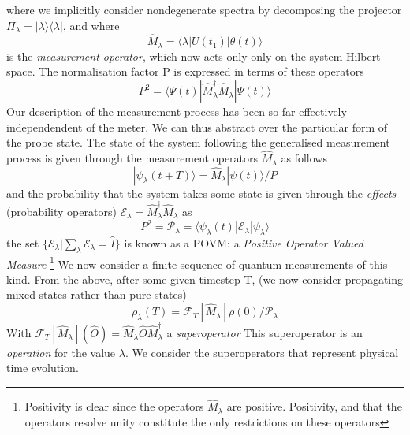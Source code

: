 where we implicitly consider nondegenerate spectra by decomposing the projector $\Pi_\lambda = |\lambda \rangle \langle \lambda |$, and where
\begin{equation}
     \hat{M}_\lambda = \langle \lambda | U(t_1) | \theta(t) \rangle
\end{equation}
is the \emph{measurement operator}, which now acts only only on the system Hilbert space.
The normalisation factor P is expressed in terms of these operators
\begin{equation}
     P^2 = \langle \Psi (t) | \hat{M}_\lambda^\dagger \hat{M}_\lambda | \Psi (t) \rangle
\end{equation}
 Our description of the measurement process has been so far effectively independendent of the meter.
We can thus abstract over the particular form of the probe state.
The state of the system following the generalised measurement process is given through the measurement operators $\hat{M}_\lambda$ as follows
\begin{equation}
 | \psi_\lambda (t + T) \rangle = \hat{M}_\lambda | \psi(t) \rangle /P
\end{equation}
 and the probability that the system takes some state is given through the \emph{effects} (probability operators) $ \mathscr{E}_\lambda = \hat{M}_\lambda^\dagger \hat{M}_\lambda $ as
\begin{equation}
     P^2 = \mathscr{P}_\lambda = \langle \psi_\lambda (t) | \mathscr{E}_\lambda | \psi_\lambda \rangle
\end{equation}
 the set $\{\mathscr{E}_\lambda | \sum_\lambda \mathscr{E}_\lambda = \hat{I} \} $ is known as a POVM: a \emph{Positive Operator Valued Measure} \footnote{Positivity is clear since the operators $\hat{M}_\lambda$ are positive.
Positivity, and that the operators resolve unity constitute the only restrictions on these operators}
We now consider a finite sequence of quantum measurements of this kind.
From the above, after some given timestep T, (we now consider propagating mixed states rather than pure states)
\begin{equation}
     \rho_\lambda (T) = \mathscr{F}_T[\hat{M}_\lambda] \rho(0) / \mathscr{P}_\lambda
\end{equation}
With $\mathscr{F}_T[\hat{M}_\lambda] ( \hat{O} ) =  \hat{M}_\lambda \hat{O} \hat{M}_\lambda ^ \dagger$ a \emph{superoperator}
This superoperator is an \emph{operation} for the value $\lambda$.
We consider the superoperators that represent physical time evolution.
